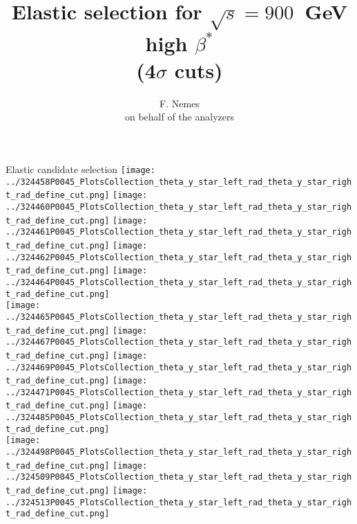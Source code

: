 \documentclass{beamer}
\title[TOTEM Physics Analysis meeting, 900 GeV high-$\beta^{*}$ for CNI analysis]{\scriptsize Elastic selection for $\sqrt{s}=900$~GeV high $\beta^{*}$\\ (4$\sigma$ cuts)}
\author{F. Nemes\\\vspace{1mm} \tiny on behalf of the analyzers}
\begin{document}
\begin{frame}
	\titlepage
\end{frame}

\begin{frame}\tiny
        \begin{block}{Elastic candidate selection}
		  \centering
                \texttt{[image: ../324458P0045\_PlotsCollection\_theta\_y\_star\_left\_rad\_theta\_y\_star\_right\_rad\_define\_cut.png]}
                \texttt{[image: ../324460P0045\_PlotsCollection\_theta\_y\_star\_left\_rad\_theta\_y\_star\_right\_rad\_define\_cut.png]}
                \texttt{[image: ../324461P0045\_PlotsCollection\_theta\_y\_star\_left\_rad\_theta\_y\_star\_right\_rad\_define\_cut.png]}
                \texttt{[image: ../324462P0045\_PlotsCollection\_theta\_y\_star\_left\_rad\_theta\_y\_star\_right\_rad\_define\_cut.png]}
                \texttt{[image: ../324464P0045\_PlotsCollection\_theta\_y\_star\_left\_rad\_theta\_y\_star\_right\_rad\_define\_cut.png]}\\
                \texttt{[image: ../324465P0045\_PlotsCollection\_theta\_y\_star\_left\_rad\_theta\_y\_star\_right\_rad\_define\_cut.png]}
                \texttt{[image: ../324467P0045\_PlotsCollection\_theta\_y\_star\_left\_rad\_theta\_y\_star\_right\_rad\_define\_cut.png]}
                \texttt{[image: ../324469P0045\_PlotsCollection\_theta\_y\_star\_left\_rad\_theta\_y\_star\_right\_rad\_define\_cut.png]}
                \texttt{[image: ../324471P0045\_PlotsCollection\_theta\_y\_star\_left\_rad\_theta\_y\_star\_right\_rad\_define\_cut.png]}
                \texttt{[image: ../324485P0045\_PlotsCollection\_theta\_y\_star\_left\_rad\_theta\_y\_star\_right\_rad\_define\_cut.png]}\\
                \texttt{[image: ../324498P0045\_PlotsCollection\_theta\_y\_star\_left\_rad\_theta\_y\_star\_right\_rad\_define\_cut.png]}
                \texttt{[image: ../324509P0045\_PlotsCollection\_theta\_y\_star\_left\_rad\_theta\_y\_star\_right\_rad\_define\_cut.png]}
                \texttt{[image: ../324513P0045\_PlotsCollection\_theta\_y\_star\_left\_rad\_theta\_y\_star\_right\_rad\_define\_cut.png]}

\end{block}
\end{frame}
\end{document}
